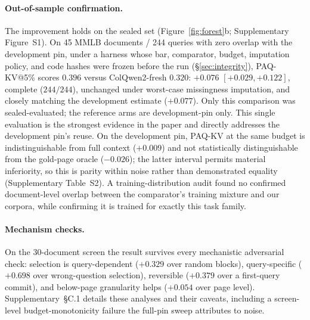 \documentclass[letterpaper]{article} %
\newcommand{\paqc}{\textsc{PAQ-KV}}
\begin{document}
\paragraph{Out-of-sample confirmation.} The improvement holds on the sealed
set (Figure~\ref{fig:forest}b; Supplementary Figure~S1).
On 45 MMLB documents / 244 queries
with zero overlap with the development pin, under a harness whose bar,
comparator, budget, imputation policy, and code hashes were frozen before
the run (\S\ref{sec:integrity}), \paqc{}@5\% scores $0.396$ versus
ColQwen2-fresh $0.320$: $+0.076$ $[+0.029,+0.122]$, complete ($244/244$), unchanged under worst-case
missingness imputation, and closely matching the development estimate
($+0.077$). Only this comparison was sealed-evaluated; the reference arms are
development-pin only. This single evaluation is the strongest evidence in
the paper and directly addresses the development pin's reuse. On the
development pin, \paqc{} at the same budget is indistinguishable from full
context ($+0.009$) and not statistically distinguishable from the gold-page
oracle ($-0.026$); the latter interval permits material inferiority, so
this is parity within noise rather than demonstrated equality
(Supplementary Table~S2). A training-distribution audit found no
confirmed document-level overlap between the comparator's training mixture
and our corpora, while confirming it is trained for exactly this task
family.

\paragraph{Mechanism checks.} On the 30-document screen the result survives
every mechanistic adversarial check: selection is query-dependent ($+0.329$
over random blocks), query-specific ($+0.698$ over wrong-question
selection), reversible ($+0.379$ over a first-query commit), and below-page
granularity helps ($+0.054$ over page level). Supplementary~\S C.1 details
these analyses and their caveats, including a screen-level
budget-monotonicity failure the full-pin sweep attributes to noise.
\end{document}
